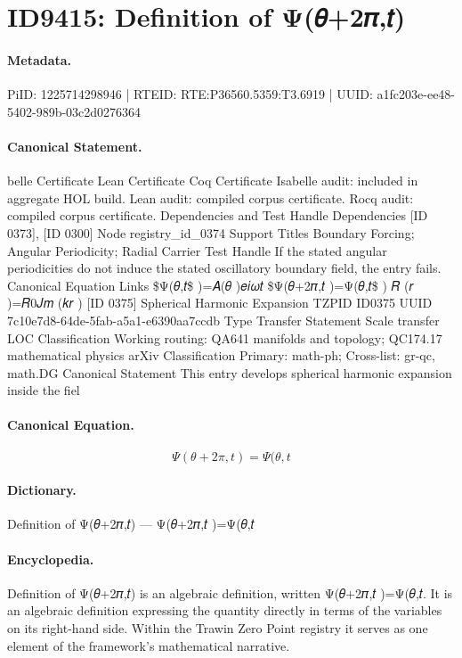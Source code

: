 \section*{ID9415: Definition of Ψ(𝜃+2𝜋,𝑡)}
\paragraph{Metadata.}
PiID: 1225714298946 | RTEID: RTE:P36560.5359:T3.6919 | UUID: a1fc203e-ee48-5402-989b-03c2d0276364

\paragraph{Canonical Statement.}
belle Certificate Lean Certificate Coq Certificate Isabelle audit: included in aggregate HOL build. Lean audit: compiled corpus certificate. Rocq audit: compiled corpus certificate. Dependencies and Test Handle Dependencies [ID 0373], [ID 0300] Node registry\_id\_0374 Support Titles Boundary Forcing; Angular Periodicity; Radial Carrier Test Handle If the stated angular periodicities do not induce the stated oscillatory boundary field, the entry fails. Canonical Equation Links \$Ψ(𝜃,𝑡\$ )=𝐴(𝜃 )𝑒𝑖𝜔𝑡 \$Ψ(𝜃+2𝜋,𝑡 )=Ψ(𝜃,𝑡\$ ) 𝑅 (𝑟 )=𝑅0𝐽𝑚 (𝑘𝑟 ) [ID 0375] Spherical Harmonic Expansion TZPID ID0375 UUID 7c10e7d8-64de-5fab-a5a1-e6390aa7ccdb Type Transfer Statement Scale transfer LOC Classification Working routing: QA641 manifolds and topology; QC174.17 mathematical physics arXiv Classification Primary: math-ph; Cross-list: gr-qc, math.DG Canonical Statement This entry develops spherical harmonic expansion inside the fiel

\paragraph{Canonical Equation.}
\[
Ψ(𝜃+2𝜋,𝑡 )=Ψ(𝜃,𝑡
\]

\paragraph{Dictionary.}
Definition of Ψ(𝜃+2𝜋,𝑡) — Ψ(𝜃+2𝜋,𝑡 )=Ψ(𝜃,𝑡

\paragraph{Encyclopedia.}
Definition of Ψ(𝜃+2𝜋,𝑡) is an algebraic definition, written Ψ(𝜃+2𝜋,𝑡 )=Ψ(𝜃,𝑡. It is an algebraic definition expressing the quantity directly in terms of the variables on its right-hand side. Within the Trawin Zero Point registry it serves as one element of the framework's mathematical narrative.
